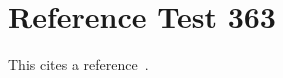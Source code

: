 \documentclass{article}
\begin{document}
\section{Reference Test 363}
This cites a reference~\cite{test363}.

\end{document}
